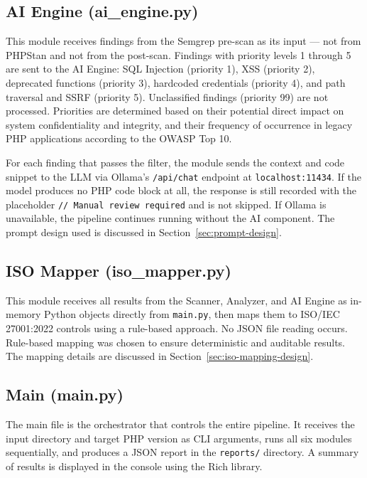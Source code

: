 \subsection{AI Engine (ai\_engine.py)}

This module receives findings from the Semgrep pre-scan as its input — not from PHPStan and not from the post-scan. Findings with priority levels 1 through 5 are sent to the AI Engine: SQL Injection (priority 1), XSS (priority 2), deprecated functions (priority 3), hardcoded credentials (priority 4), and path traversal and SSRF (priority 5). Unclassified findings (priority 99) are not processed. Priorities are determined based on their potential direct impact on system confidentiality and integrity, and their frequency of occurrence in legacy PHP applications according to the OWASP Top 10.

\begin{sloppypar}

For each finding that passes the filter, the module sends the context and code snippet to the LLM via Ollama's \texttt{/api/chat} endpoint at \texttt{localhost:11434}. If the model produces no PHP code block at all, the response is still recorded with the placeholder \texttt{// Manual review required} and is not skipped. If Ollama is unavailable, the pipeline continues running without the AI component. The prompt design used is discussed in Section~\ref{sec:prompt-design}.

\end{sloppypar}

\subsection{ISO Mapper (iso\_mapper.py)}

This module receives all results from the Scanner, Analyzer, and AI Engine as in-memory Python objects directly from \texttt{main.py}, then maps them to ISO/IEC 27001:2022 controls using a rule-based approach. No JSON file reading occurs. Rule-based mapping was chosen to ensure deterministic and auditable results. The mapping details are discussed in Section~\ref{sec:iso-mapping-design}.

\subsection{Main (main.py)}

The main file is the orchestrator that controls the entire pipeline. It receives the input directory and target PHP version as CLI arguments, runs all six modules sequentially, and produces a JSON report in the \texttt{reports/} directory. A summary of results is displayed in the console using the Rich library.

